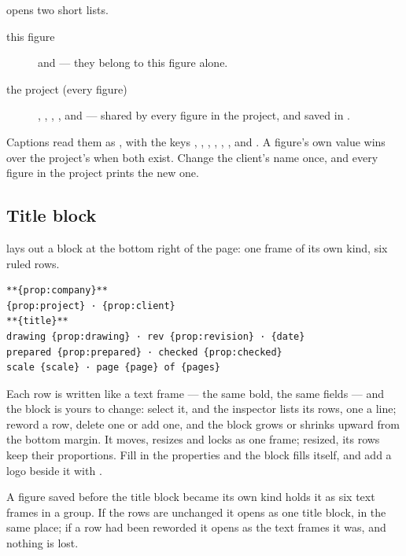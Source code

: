  opens two short lists.

\begin{description}
\item[this figure]  and  — they belong to this figure alone.
\item[the project (every figure)] , , , ,  and  — shared by every figure in the project, and saved in .
\end{description}

Captions read them as , with the keys , , , , , ,  and . A figure's own value wins over the project's when both exist. Change the client's name once, and every figure in the project prints the new one.

\subsection{Title block}

 lays out a block at the bottom right of the page: one frame of its own kind, six ruled rows.

\begin{lstlisting}
**{prop:company}**
{prop:project} · {prop:client}
**{title}**
drawing {prop:drawing} · rev {prop:revision} · {date}
prepared {prop:prepared} · checked {prop:checked}
scale {scale} · page {page} of {pages}
\end{lstlisting}

Each row is written like a text frame — the same bold, the same fields — and the block is yours to change: select it, and the inspector lists its rows, one a line; reword a row, delete one or add one, and the block grows or shrinks upward from the bottom margin. It moves, resizes and locks as one frame; resized, its rows keep their proportions. Fill in the properties and the block fills itself, and add a logo beside it with .

A figure saved before the title block became its own kind holds it as six text frames in a group. If the rows are unchanged it opens as one title block, in the same place; if a row had been reworded it opens as the text frames it was, and nothing is lost.



